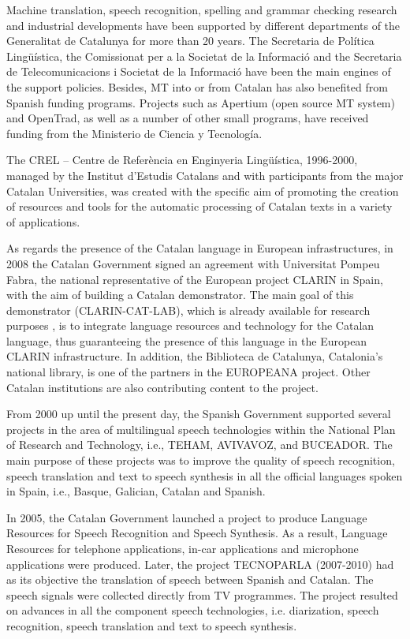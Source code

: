 \begin{multicols}{2}
Machine translation, speech recognition, spelling and grammar checking research and industrial developments have been supported by different departments of the Generalitat de Catalunya for more than 20 years. The Secretaria de Política Lingüística, the Comissionat per a la Societat de la Informació and the Secretaria de Telecomunicacions i Societat de la Informació have been the main engines of the support policies. Besides, MT into or from Catalan has also benefited from Spanish funding programs. Projects such as Apertium (open source MT system) and OpenTrad, as well as a number of other small programs, have received funding from the Ministerio de Ciencia y Tecnología. 

The CREL – Centre de Referència en Enginyeria Lingüística, 1996-2000, managed by the Institut d’Estudis Catalans and with participants from the major Catalan Universities, was created with the specific aim of promoting the creation of resources and tools for the automatic processing of Catalan texts in a variety of applications. 

As regards the presence of the Catalan language in European infrastructures, in 2008 the Catalan Government signed an agreement with Universitat Pompeu Fabra, the national representative of the European project CLARIN in Spain, with the aim of building a Catalan demonstrator. The main goal of this demonstrator (CLARIN-CAT-LAB), which is already available for research purposes \cite{CAT-Nota30}, is to integrate language resources and technology for the Catalan language, thus guaranteeing the presence of this language in the European CLARIN infrastructure. In addition, the Biblioteca de Catalunya, Catalonia’s national library, is one of the partners in the EUROPEANA project. Other Catalan institutions are also contributing content to the project.

From 2000 up until the present day, the Spanish Government supported several projects in the area of multilingual speech technologies within the National Plan of Research and Technology, i.e., TEHAM, AVIVAVOZ, and BUCEADOR. The main purpose of these projects was to improve the quality of speech recognition, speech translation and text to speech synthesis in all the official languages spoken in Spain, i.e., Basque, Galician, Catalan and Spanish.

In 2005, the Catalan Government launched a project to produce Language Resources for Speech Recognition and Speech Synthesis. As a result, Language Resources for telephone applications, in-car applications and microphone applications were produced. Later, the project TECNOPARLA (2007-2010) had as its objective the translation of speech between Spanish and Catalan. The speech signals were collected directly from TV programmes. The project resulted on advances in all the component speech technologies, i.e.  diarization, speech recognition, speech translation and text to speech synthesis.
  

\end{multicols}
